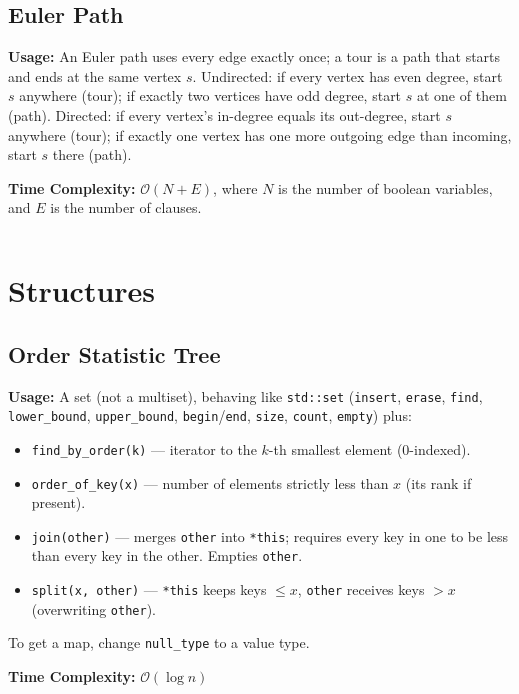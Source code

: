   \subsection{Euler Path}
    \par \textbf{Usage:} An Euler path uses every edge exactly once; a tour is a path that starts and ends at the same vertex $s$. Undirected: if every vertex has even degree, start $s$ anywhere (tour); if exactly two vertices have odd degree, start $s$ at one of them (path). Directed: if every vertex's in-degree equals its out-degree, start $s$ anywhere (tour); if exactly one vertex has one more outgoing edge than incoming, start $s$ there (path).
    \par \textbf{Time Complexity:} $\mathcal{O}(N + E)$, where $N$ is the number of boolean variables, and $E$ is the number of clauses.
    \inputminted{cpp}{library/graphs/euler_path.cpp}

\section{Structures}
  \subsection{Order Statistic Tree}
    \par \textbf{Usage:} A set (not a multiset), behaving like \texttt{std::set} (\texttt{insert}, \texttt{erase}, \texttt{find}, \texttt{lower\_bound}, \texttt{upper\_bound}, \texttt{begin}/\texttt{end}, \texttt{size}, \texttt{count}, \texttt{empty}) plus:
    \begin{itemize}
        \item \texttt{find\_by\_order(k)} --- iterator to the $k$-th smallest element (0-indexed).
        \item \texttt{order\_of\_key(x)} --- number of elements strictly less than $x$ (its rank if present).
        \item \texttt{join(other)} --- merges \texttt{other} into \texttt{*this}; requires every key in one to be less than every key in the other. Empties \texttt{other}.
        \item \texttt{split(x, other)} --- \texttt{*this} keeps keys $\leq x$, \texttt{other} receives keys $> x$ (overwriting \texttt{other}).
    \end{itemize}
    To get a map, change \texttt{null\_type} to a value type.
    \par \textbf{Time Complexity:} $\mathcal{O}(\log n)$
    \inputminted{cpp}{library/structures/order_tree.cpp}

